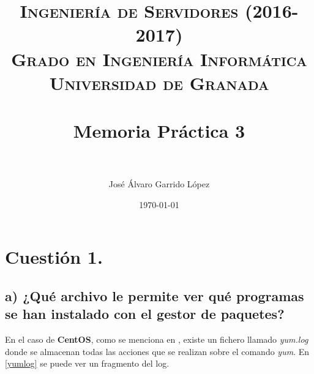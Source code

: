 


\title{	
\normalfont \normalsize 
\textsc{\textbf{Ingeniería de Servidores (2016-2017)} \\ Grado en Ingeniería Informática \\ Universidad de Granada} \\ [25pt] %
\horrule{0.5pt} \\[0.4cm] %
\huge Memoria Práctica 3 \\ %
\horrule{2pt} \\[0.5cm] %
}

\author{José Álvaro Garrido López} %

\date{\normalsize\today} %



\maketitle %

\newpage %

\tableofcontents %

\listoffigures

\newpage

\newpage

\section{Cuestión 1.}

\subsection{a) ¿Qué archivo le permite ver qué programas se han instalado con el gestor de paquetes?}

En el caso de \textbf{CentOS}, como se menciona en \cite{yum}, existe un fichero llamado \textit{yum.log} donde se almacenan todas las acciones que se realizan sobre el comando \textit{yum}. En \ref{yumlog} se puede ver un fragmento del log.

